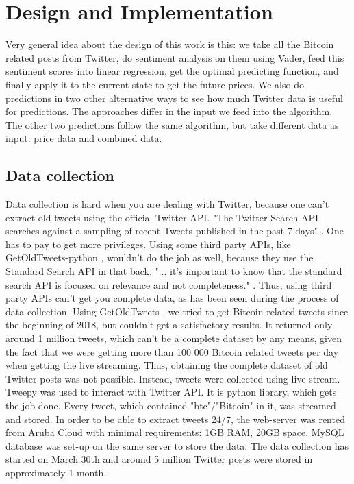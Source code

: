 \documentclass[a4paper,11pt,oneside]{article}
\begin{document}
  \section{Design and Implementation}
  
  \label{designandimplementation}

  Very general idea about the design of this work is this: we take all the Bitcoin related posts from Twitter, do sentiment analysis on them using Vader, feed this sentiment scores into linear regression, get the optimal predicting function, and finally apply it to the current state to get the future prices. We also do predictions in two other alternative ways to see how much Twitter data is useful for predictions. The approaches differ in the input we feed into the algorithm. The other two predictions follow the same algorithm, but take different data as input: price data and combined data.
  
  \subsection{Data collection}
  
  Data collection is hard when you are dealing with Twitter, because one can't extract old tweets using the official Twitter API. "The Twitter Search API searches against a sampling of recent Tweets published in the past 7 days" \cite{twitterstandardsearch}. One has to pay to get more privileges. Using some third party APIs, like GetOldTweets-python \cite{getoldtweets}, wouldn't do the job as well, because they use the Standard Search API in that back. "... it's important to know that the standard search API is focused on relevance and not completeness." \cite{twitterstandardsearch}. Thus, using third party APIs can't get you complete data, as has been seen during the process of data collection. Using GetOldTweets \cite{getoldtweets}, we tried to get Bitcoin related tweets since the beginning of 2018, but couldn't get a satisfactory results. It returned only around 1 million tweets, which can't be a complete dataset by any means, given the fact that we were getting more than 100 000 Bitcoin related tweets per day when getting the live streaming. Thus, obtaining the complete dataset of old Twitter posts was not possible. Instead, tweets were collected using live stream. Tweepy \cite{tweepy} was used to interact with Twitter API. It is python library, which gets the job done. Every tweet, which contained "btc"/"Bitcoin" in it, was streamed and stored. In order to be able to extract tweets 24/7, the web-server was rented from Aruba Cloud \cite{arubacloud} with minimal requirements: 1GB RAM, 20GB space. MySQL database was set-up on the same server to store the data. The data collection has started on March 30th and around 5 million Twitter posts were stored in approximately 1 month.
  
\end{document}
